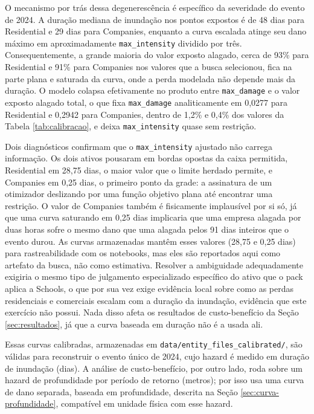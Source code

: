 \documentclass[11pt]{article}
\begin{document}
O mecanismo por trás dessa degenerescência é específico da severidade do evento de 2024. A
duração mediana de inundação nos pontos expostos é de 48 dias para Residential e 29 dias
para Companies, enquanto a curva escalada atinge seu dano máximo em aproximadamente
\texttt{max\_intensity} dividido por três. Consequentemente, a grande maioria do valor
exposto alagado, cerca de 93\% para Residential e 91\% para Companies nos valores que a
busca selecionou, fica na parte plana e saturada da curva, onde a perda modelada não
depende mais da duração. O modelo colapsa efetivamente no produto entre
\texttt{max\_damage} e o valor exposto alagado total, o que fixa \texttt{max\_damage}
analiticamente em 0,0277 para Residential e 0,2942 para Companies, dentro de 1,2\% e 0,4\%
dos valores da Tabela \ref{tab:calibracao}, e deixa \texttt{max\_intensity} quase sem
restrição.

Dois diagnósticos confirmam que o \texttt{max\_intensity} ajustado não carrega informação.
Os dois ativos pousaram em bordas opostas da caixa permitida, Residential em 28,75 dias, o
maior valor que o limite herdado permite, e Companies em 0,25 dias, o primeiro ponto da
grade: a assinatura de um otimizador deslizando por uma função objetivo plana até encontrar
uma restrição. O valor de Companies também é fisicamente implausível por si só, já que uma
curva saturando em 0,25 dias implicaria que uma empresa alagada por duas horas sofre o
mesmo dano que uma alagada pelos 91 dias inteiros que o evento durou. As curvas armazenadas
mantêm esses valores (28,75 e 0,25 dias) para rastreabilidade com os notebooks, mas eles
são reportados aqui como artefato da busca, não como estimativa. Resolver a ambiguidade
adequadamente exigiria o mesmo tipo de julgamento especializado específico do ativo que o
pack aplica a Schools, o que por sua vez exige evidência local sobre como as perdas
residenciais e comerciais escalam com a duração da inundação, evidência que este exercício
não possui. Nada disso afeta os resultados de custo-benefício da Seção
\ref{sec:resultados}, já que a curva baseada em duração não é a usada ali.

Essas curvas calibradas, armazenadas em \texttt{data/entity\_files\_calibrated/}, são
válidas para reconstruir o evento único de 2024, cujo hazard é medido em duração de
inundação (dias). A análise de custo-benefício, por outro lado, roda sobre um hazard de
profundidade por período de retorno (metros); por isso usa uma curva de dano separada,
baseada em profundidade, descrita na Seção \ref{sec:curva-profundidade}, compatível em
unidade física com esse hazard.
\end{document}
